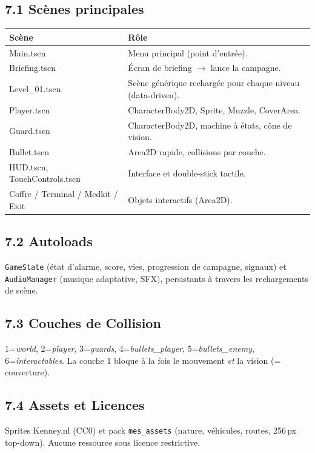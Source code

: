 \documentclass[11pt,a4paper]{article}
\newcommand{\code}[1]{\colorbox{codebg}{\texttt{#1}}}
\begin{document}
\subsection{7.1 Sc\`enes principales}
\begin{center}
\begin{tabular}{ll}
\toprule
\textbf{Sc\`ene} & \textbf{R\^ole} \\
\midrule
Main.tscn & Menu principal (point d'entr\'ee). \\
Briefing.tscn & \'Ecran de briefing $\to$ lance la campagne. \\
Level\_01.tscn & Sc\`ene g\'en\'erique recharg\'ee pour chaque niveau (data-driven). \\
Player.tscn & CharacterBody2D, Sprite, Muzzle, CoverArea. \\
Guard.tscn & CharacterBody2D, machine \`a \'etats, c\^one de vision. \\
Bullet.tscn & Area2D rapide, collisions par couche. \\
HUD.tscn, TouchControls.tscn & Interface et double-stick tactile. \\
Coffre / Terminal / Medkit / Exit & Objets interactifs (Area2D). \\
\bottomrule
\end{tabular}
\end{center}

\subsection{7.2 Autoloads}
\code{GameState} (\'etat d'alarme, score, vies, progression de campagne, signaux)
et \code{AudioManager} (musique adaptative, SFX), persistants \`a travers les
rechargements de sc\`ene.

\subsection{7.3 Couches de Collision}
1=\emph{world}, 2=\emph{player}, 3=\emph{guards}, 4=\emph{bullets\_player},
5=\emph{bullets\_enemy}, 6=\emph{interactables}. La couche 1 bloque \`a la fois le
mouvement \emph{et} la vision (= couverture).

\subsection{7.4 Assets et Licences}
Sprites Kenney.nl (CC0) et pack \code{mes\_assets} (nature, v\'ehicules, routes,
256\,px top-down). Aucune ressource sous licence restrictive.
\end{document}
